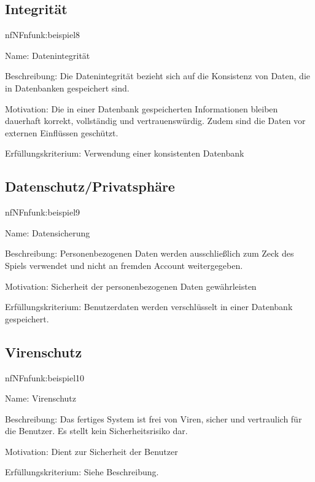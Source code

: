 \subsection{Integrität}

\begin{description}[leftmargin=5em, style=sameline]	
	\begin{lhp}{nf}{NF}{nfunk:beispiel8}
		\item [Name:] Datenintegrität
		\item [Beschreibung:] Die Datenintegrität bezieht sich auf die Konsistenz von Daten, die in Datenbanken gespeichert sind.
		\item [Motivation:] Die in einer Datenbank gespeicherten Informationen bleiben dauerhaft korrekt, vollständig und vertrauenswürdig. Zudem sind die Daten vor externen Einflüssen geschützt.
		\item [Erfüllungskriterium:] Verwendung einer konsistenten Datenbank
	\end{lhp}
\end{description}

\subsection{Datenschutz/Privatsphäre}

\begin{description}[leftmargin=5em, style=sameline]	
	\begin{lhp}{nf}{NF}{nfunk:beispiel9}
		\item [Name:] Datensicherung
		\item [Beschreibung:] Personenbezogenen Daten werden ausschließlich zum Zeck des Spiels verwendet und nicht an fremden Account weitergegeben.
		\item [Motivation:] Sicherheit der personenbezogenen Daten gewährleisten
		\item [Erfüllungskriterium:] Benutzerdaten werden verschlüsselt in einer Datenbank gespeichert.

	\end{lhp}
\end{description}


\subsection{Virenschutz}

\begin{description}[leftmargin=5em, style=sameline]	
	\begin{lhp}{nf}{NF}{nfunk:beispiel10}
		\item [Name:] Virenschutz
		\item [Beschreibung:] Das fertiges System ist frei von Viren, sicher und vertraulich für die Benutzer. Es stellt kein Sicherheitsrisiko dar.
		\item [Motivation:] Dient zur Sicherheit der Benutzer
		\item [Erfüllungskriterium:] Siehe Beschreibung.
	\end{lhp}
\end{description}

